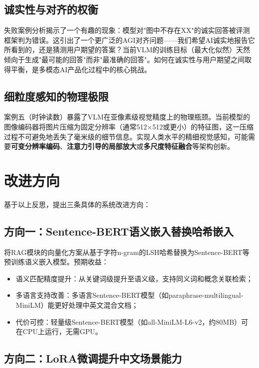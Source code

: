 \subsection{诚实性与对齐的权衡}

失败案例分析揭示了一个有趣的现象：模型对"图中不存在XX"的诚实回答被评测框架判为错误。这引出了一个更广泛的AGI对齐问题——我们希望AI诚实地报告它所看到的，还是猜测用户期望的答案？当前VLM的训练目标（最大化似然）天然倾向于生成"最可能的回答"而非"最准确的回答"。如何在诚实性与用户期望之间取得平衡，是多模态AI产品化过程中的核心挑战。

\subsection{细粒度感知的物理极限}

案例五（时钟读数）暴露了VLM在亚像素级视觉精度上的物理瓶颈。当前模型的图像编码器将图片压缩为固定分辨率（通常512×512或更小）的特征图，这一压缩过程不可避免地丢失了毫米级的细节信息。实现人类水平的精细视觉感知，可能需要\textbf{可变分辨率编码}、\textbf{注意力引导的局部放大}或\textbf{多尺度特征融合}等架构创新。

\section{改进方向}

基于以上反思，提出三条具体的系统改进方向：

\subsection{方向一：Sentence-BERT语义嵌入替换哈希嵌入}

将RAG模块的向量化方案从基于字符n-gram的LSH哈希替换为Sentence-BERT等预训练语义嵌入模型。预期收益：
\begin{itemize}
  \item 语义匹配精度提升：从关键词级提升至语义级，支持同义词和概念关联检索；
  \item 多语言支持改善：多语言Sentence-BERT模型（如paraphrase-multilingual-MiniLM）能更好处理中英文混合文档；
  \item 代价可控：轻量级Sentence-BERT模型（如all-MiniLM-L6-v2，约80MB）可在CPU上运行，无需GPU。
\end{itemize}

\subsection{方向二：LoRA微调提升中文场景能力}

